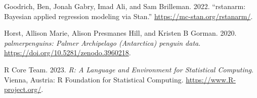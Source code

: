 \documentclass[
  letterpaper,
  DIV=11,
  numbers=noendperiod]{scrartcl}
\newlength{\cslhangindent}
\newenvironment{CSLReferences}[2] %
 {\begin{list}{}{%
  \setlength{\itemindent}{0pt}
  \setlength{\leftmargin}{0pt}
  \setlength{\parsep}{0pt}
  \ifodd #1
   \setlength{\leftmargin}{\cslhangindent}
   \setlength{\itemindent}{-1\cslhangindent}
  \fi
  \setlength{\itemsep}{#2\baselineskip}}}
 {\end{list}}
\begin{document}
\label{refs}
\begin{CSLReferences}{1}{0}
Goodrich, Ben, Jonah Gabry, Imad Ali, and Sam Brilleman. 2022.
{``{rstanarm: {Bayesian} applied regression modeling via {Stan}}.''}
\url{https://mc-stan.org/rstanarm/}.

Horst, Allison Marie, Alison Presmanes Hill, and Kristen B Gorman. 2020.
\emph{{palmerpenguins: Palmer Archipelago (Antarctica) penguin data}}.
\url{https://doi.org/10.5281/zenodo.3960218}.

R Core Team. 2023. \emph{{R: A Language and Environment for Statistical
Computing}}. Vienna, Austria: R Foundation for Statistical Computing.
\url{https://www.R-project.org/}.

\end{CSLReferences}
\end{document}
